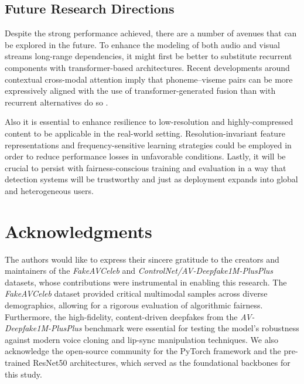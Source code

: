 \documentclass[conference]{IEEEtran}
\begin{document}
\subsection{Future Research Directions}
Despite the strong performance achieved, there are a number of avenues that can be explored in the future. To enhance the modeling of both audio and visual streams long-range dependencies, it might first be better to substitute recurrent components with transformer-based architectures. Recent developments around contextual cross-modal attention imply that phoneme–viseme pairs can be more expressively aligned with the use of transformer-generated fusion than with recurrent alternatives do so  \cite{Katamneni2024}. 

Also it is essential to enhance resilience to low-resolution and highly-compressed content to be applicable in the real-world setting. Resolution-invariant feature representations and frequency-sensitive learning strategies could be employed in order to reduce performance losses in unfavorable conditions. Lastly, it will be crucial to persist with fairness-conscious training and evaluation in a way that detection systems will be trustworthy and just as deployment expands into global and heterogeneous users.



\section*{Acknowledgments}
The authors would like to express their sincere gratitude to the creators and maintainers of the \textit{FakeAVCeleb} and \textit{ControlNet/AV-Deepfake1M-PlusPlus} datasets, whose contributions were instrumental in enabling this research. The \textit{FakeAVCeleb} dataset provided critical multimodal samples across diverse demographics, allowing for a rigorous evaluation of algorithmic fairness. Furthermore, the high-fidelity, content-driven deepfakes from the \textit{AV-Deepfake1M-PlusPlus} benchmark were essential for testing the model's robustness against modern voice cloning and lip-sync manipulation techniques. We also acknowledge the open-source community for the PyTorch framework and the pre-trained ResNet50 architectures, which served as the foundational backbones for this study.
\end{document}

